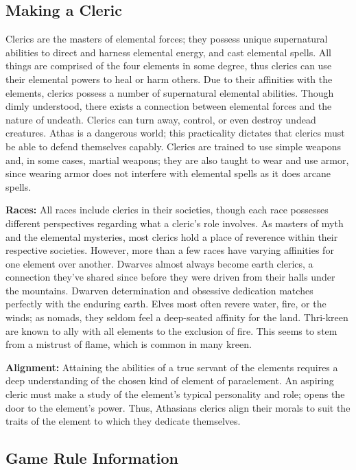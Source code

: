 \subsection{Making a Cleric}

Clerics are the masters of elemental forces; they possess unique supernatural abilities to direct and harness elemental energy, and cast elemental spells. All things are comprised of the four elements in some degree, thus clerics can use their elemental powers to heal or harm others. Due to their affinities with the elements, clerics possess a number of supernatural elemental abilities. Though dimly understood, there exists a connection between elemental forces and the nature of undeath. Clerics can turn away, control, or even destroy undead creatures. Athas is a dangerous world; this practicality dictates that clerics must be able to defend themselves capably. Clerics are trained to use simple weapons and, in some cases, martial weapons; they are also taught to wear and use armor, since wearing armor does not interfere with elemental spells as it does arcane spells.

\textbf{Races:} All races include clerics in their societies, though each race possesses different perspectives regarding what a cleric's role involves. As masters of myth and the elemental mysteries, most clerics hold a place of reverence within their respective societies. However, more than a few races have varying affinities for one element over another. Dwarves almost always become earth clerics, a connection they've shared since before they were driven from their halls under the mountains. Dwarven determination and obsessive dedication matches perfectly with the enduring earth. Elves most often revere water, fire, or the winds; as nomads, they seldom feel a deep-seated affinity for the land. Thri-kreen are known to ally with all elements to the exclusion of fire. This seems to stem from a mistrust of flame, which is common in many kreen.

\textbf{Alignment:} Attaining the abilities of a true servant of the elements requires a deep understanding of the chosen kind of element of paraelement. An aspiring cleric must make a study of the element's typical personality and role; opens the door to the element's power. Thus, Athasians clerics align their morals to suit the traits of the element to which they dedicate themselves.

\subsection{Game Rule Information}

